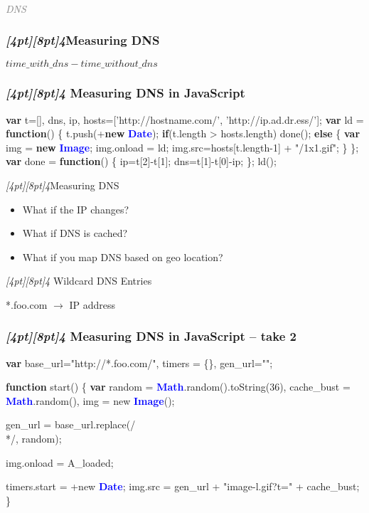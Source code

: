 \documentclass{beamer}
\newcommand{\sn}[1]{\textrm{\textit{\Huge{\raisebox{-3pt}[4pt][8pt]{\textcolor{f2elblue}{#1}}}}}\hspace{4pt}}
\newcommand{\innersplash}[1]{
  \begin{center}
    \large \textrm{\textit{ #1 } }
  \end{center}
}
\newcommand{\splashslide}[2][{}]{
  \begin{frame}
  \frametitle{#1}
  \innersplash{#2}
  \end{frame}
}
\newcommand{\leadinslide}[2]{
  \splashslide{
     {\fontsize{150}{20}\selectfont{\raisebox{0pt}[90pt][0pt]{\textcolor{light-gray}{#1}}}} \\ \huge \textcolor{gray}{#2}
  }
}
\def\green<#1>#2{\textcolor<#1>{dark-green}{\textbf<#1>{#2}}}
\def\blue<#1>#2{\textcolor<#1>{blue}{\textbf<#1>{#2}}}
\begin{document}
\leadinslide{4}{DNS}

\splashslide[\sn{4}Measuring DNS]{ \( time\_with\_dns - time\_without\_dns \) }

\begin{frame}[fragile]
\frametitle{\sn{4} Measuring DNS in JavaScript}
\vspace{-.3cm}
\begin{semiverbatim}
\green<1>{var} t=[], dns, ip, hosts=['http://hostname.com/',
                          'http://ip.ad.dr.ess/'];
\green<1>{var} ld = \green<1>{function}() \{
   t.push(+\green<1>{new} \blue<1>{Date});
   \green<1>{if}(t.length > hosts.length) 
     done();
   \green<1>{else} \{
     \green<1>{var} img = \green<1>{new} \blue<1>{Image};
     img.onload = ld;
     img.src=hosts[t.length-1] + "/1x1.gif";
   \}
\};
\green<1>{var} done = \green<1>{function}() \{
  ip=t[2]-t[1];
  dns=t[1]-t[0]-ip;
\};
ld();
\end{semiverbatim}
\end{frame}

\begin{frame}{\sn{4}Measuring DNS}
\begin{itemize}
\item What if the IP changes?
\item What if DNS is cached?
\item What if you map DNS based on geo location?
\end{itemize}
\end{frame}

\begin{frame}{\sn{4} Wildcard DNS Entries}
  \begin{center}
     *.foo.com $ \rightarrow $ IP address
  \end{center}
\end{frame}

\begin{frame}[fragile]
\frametitle{\sn{4} Measuring DNS in JavaScript -- take 2}
\begin{semiverbatim}
\green<1>{var} base\_url="http://*.foo.com/",
    timers = \{\}, gen\_url="";

\green<1>{function} start() \{
  \green<1>{var} random = \blue<1>{Math}.random().toString(36),
      cache\_bust = \blue<1>{Math}.random(),
      img = new \blue<1>{Image}();

  gen\_url = base\_url.replace(/\\*/, random);

  img.onload = A\_loaded;

  timers.start = +new \blue<1>{Date};
  img.src = gen\_url + "image-l.gif?t=" + cache\_bust;
\}
\end{semiverbatim}
\end{frame}
\end{document}
